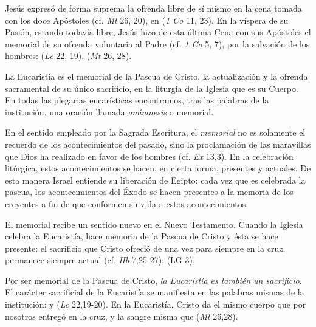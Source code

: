 \begin{ccebody}

 Jesús expresó de forma suprema la ofrenda libre de sí mismo en la cena tomada con los doce Apóstoles (cf. \textit{Mt} 26, 20), en  (\textit{1 Co} 11, 23). En la víspera de su Pasión, estando todavía libre, Jesús hizo de esta última Cena con sus Apóstoles el memorial de su ofrenda voluntaria al Padre (cf. \textit{1 Co} 5, 7), por la salvación de los hombres:  (\textit{Lc} 22, 19).  (\textit{Mt} 26, 28).


 La Eucaristía es el memorial de la Pascua de Cristo, la actualización y la ofrenda sacramental de su único sacrificio, en la liturgia de la Iglesia que es su Cuerpo. En todas las plegarias eucarísticas encontramos, tras las palabras de la institución, una oración llamada \textit{anámnesis} o memorial.

 En el sentido empleado por la Sagrada Escritura, el \textit{memorial} no es solamente el recuerdo de los acontecimientos del pasado, sino la proclamación de las maravillas que Dios ha realizado en favor de los hombres (cf. \textit{Ex} 13,3). En la celebración litúrgica, estos acontecimientos se hacen, en cierta forma, presentes y actuales. De esta manera Israel entiende su liberación de Egipto: cada vez que es celebrada la pascua, los acontecimientos del Éxodo se hacen presentes a la memoria de los creyentes a fin de que conformen su vida a estos acontecimientos.

 El memorial recibe un sentido nuevo en el Nuevo Testamento. Cuando la Iglesia celebra la Eucaristía, hace memoria de la Pascua de Cristo y ésta se hace presente: el sacrificio que Cristo ofreció de una vez para siempre en la cruz, permanece siempre actual (cf. \textit{Hb} 7,25-27):  (LG 3).

 Por ser memorial de la Pascua de Cristo, \textit{la Eucaristía es también un sacrificio}. El carácter sacrificial de la Eucaristía se manifiesta en las palabras mismas de la institución:  y  (\textit{Lc} 22,19-20). En la Eucaristía, Cristo da el mismo cuerpo que por nosotros entregó en la cruz, y la sangre misma que  (\textit{Mt} 26,28).



\end{ccebody}

